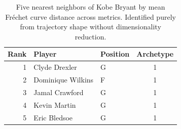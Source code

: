\begin{table}[htbp]
  \centering\small
  \begin{tabular}{rllc}
    \toprule
    Rank & Player & Position & Archetype \\
    \midrule
    1 & Clyde Drexler & G & 1 \\
    2 & Dominique Wilkins & F & 1 \\
    3 & Jamal Crawford & G & 1 \\
    4 & Kevin Martin & G & 1 \\
    5 & Eric Bledsoe & G & 1 \\
    \bottomrule
  \end{tabular}
  \caption{Five nearest neighbors of Kobe Bryant by mean Fr\'{e}chet curve distance across metrics. Identified purely from trajectory shape without dimensionality reduction.}
  \label{tab:Kobe_Bryant_frechet_curve_neighbors}
\end{table}

